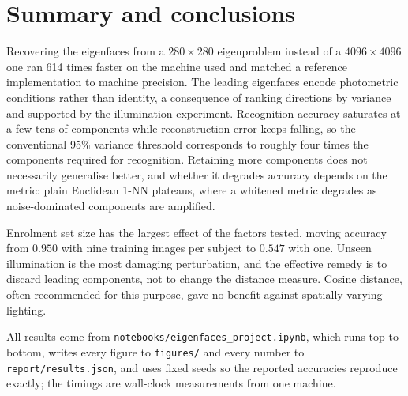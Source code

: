 \documentclass[10pt,a4paper]{article}
\begin{document}
\section{Summary and conclusions}

Recovering the eigenfaces from a $280\times280$ eigenproblem instead of a
$4096\times4096$ one ran 614 times faster on the machine used and matched a
reference implementation to machine precision. The leading
eigenfaces encode photometric conditions rather than identity, a consequence of
ranking directions by variance and supported by the illumination experiment.
Recognition accuracy saturates at a few tens of components while
reconstruction error keeps falling, so the conventional 95\% variance threshold
corresponds to roughly four times the components required for recognition. Retaining more
components does not necessarily generalise better, and whether it degrades
accuracy depends on the metric: plain Euclidean 1-NN plateaus, where a whitened
metric degrades as noise-dominated components are amplified.

Enrolment set size has the largest effect of the factors tested, moving accuracy from
$0.950$ with nine training images per subject to $0.547$ with one. Unseen
illumination is the most damaging perturbation, and the effective remedy is to
discard leading components, not to change the distance measure. Cosine
distance, often recommended for this purpose, gave no benefit against spatially
varying lighting.

All results come from \texttt{notebooks/eigenfaces\_project.ipynb}, which runs
top to bottom, writes every figure to \texttt{figures/} and every number to
\texttt{report/results.json}, and uses fixed seeds so the reported accuracies
reproduce exactly; the timings are wall-clock measurements from one machine.
\end{document}
